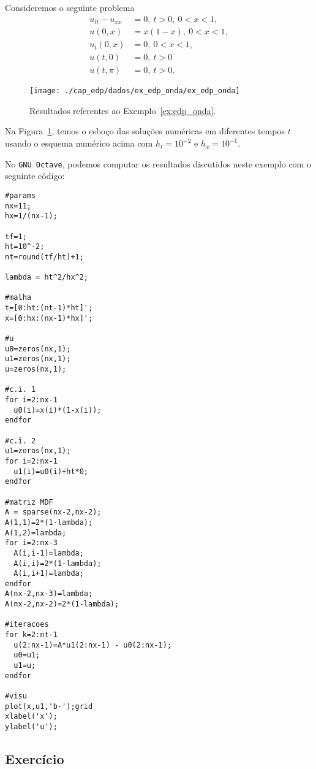 \begin{ex}\label{ex:edp_onda}
  Consideremos o seguinte problema
  \begin{align}
    u_{tt} - u_{xx} &= 0,~t>0,~0< x < 1,\\
    u(0,x) &= x(1-x),~0<x<1,\\
    u_t(0,x) &= 0,~0<x<1,\\
    u(t,0) &= 0,~t>0\\
    u(t,\pi) &= 0,~t>0.
  \end{align}

\begin{figure}[h!]
  \centering
  \texttt{[image: ./cap\_edp/dados/ex\_edp\_onda/ex\_edp\_onda]}
  \caption{Resultados referentes ao Exemplo~\ref{ex:edp_onda}.}
  \label{fig:ex_edp_onda}
\end{figure}

Na Figura~\ref{fig:ex_edp_onda}, temos o esboço das soluções numéricas em diferentes tempos $t$ usando o esquema numérico acima com $h_t=10^{-2}$ e $h_x=10^{-1}$.

\ifisoctave
No \verb+GNU Octave+, podemos computar os resultados discutidos neste exemplo com o seguinte código:
\begin{verbatim}
#params
nx=11;
hx=1/(nx-1);

tf=1;
ht=10^-2;
nt=round(tf/ht)+1;

lambda = ht^2/hx^2;

#malha
t=[0:ht:(nt-1)*ht]'; 
x=[0:hx:(nx-1)*hx]';

#u
u0=zeros(nx,1);
u1=zeros(nx,1);
u=zeros(nx,1);

#c.i. 1
for i=2:nx-1
  u0(i)=x(i)*(1-x(i));
endfor

#c.i. 2
u1=zeros(nx,1);
for i=2:nx-1
  u1(i)=u0(i)+ht*0;
endfor

#matriz MDF
A = sparse(nx-2,nx-2);
A(1,1)=2*(1-lambda);
A(1,2)=lambda;
for i=2:nx-3
  A(i,i-1)=lambda;
  A(i,i)=2*(1-lambda);
  A(i,i+1)=lambda;
endfor
A(nx-2,nx-3)=lambda;
A(nx-2,nx-2)=2*(1-lambda);

#iteracoes
for k=2:nt-1
  u(2:nx-1)=A*u1(2:nx-1) - u0(2:nx-1);
  u0=u1;
  u1=u;
endfor

#visu
plot(x,u1,'b-');grid
xlabel('x');
ylabel('u');
\end{verbatim}
\fi
\end{ex}

\subsection*{Exercício}

